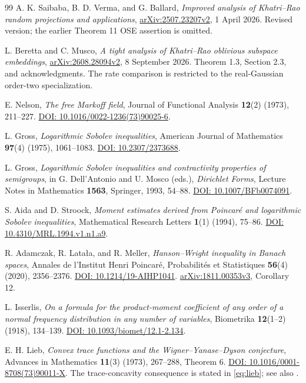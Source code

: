 \documentclass[11pt]{article}
\numberwithin{equation}{section}
\theoremstyle{definition}\newtheorem{definition}[theorem]{Definition}
\theoremstyle{remark}\newtheorem{remark}[theorem]{Remark}
\begin{document}
\begin{thebibliography}{99}
A. K. Saibaba, B. D. Verma, and G. Ballard,
\emph{Improved analysis of Khatri--Rao random projections and applications},
\href{https://arxiv.org/abs/2507.23207v2}{arXiv:2507.23207v2}, 1 April 2026.
Revised version; the earlier Theorem 11 OSE assertion is omitted.

L. Beretta and C. Musco,
\emph{A tight analysis of Khatri--Rao oblivious subspace embeddings},
\href{https://arxiv.org/abs/2608.28094v2}{arXiv:2608.28094v2}, 8 September 2026.
Theorem 1.3, Section 2.3, and acknowledgments.
The rate comparison is restricted to the real-Gaussian order-two specialization.

E. Nelson, \emph{The free Markoff field},
Journal of Functional Analysis \textbf{12}(2) (1973), 211--227.
\href{https://doi.org/10.1016/0022-1236(73)90025-6}{DOI: 10.1016/0022-1236(73)90025-6}.

L. Gross, \emph{Logarithmic Sobolev inequalities},
American Journal of Mathematics \textbf{97}(4) (1975), 1061--1083.
\href{https://doi.org/10.2307/2373688}{DOI: 10.2307/2373688}.

L. Gross, \emph{Logarithmic Sobolev inequalities and contractivity properties of
semigroups}, in G. Dell'Antonio and U. Mosco (eds.), \emph{Dirichlet Forms},
Lecture Notes in Mathematics \textbf{1563}, Springer, 1993, 54--88.
\href{https://doi.org/10.1007/BFb0074091}{DOI: 10.1007/BFb0074091}.

S. Aida and D. Stroock,
\emph{Moment estimates derived from Poincar\'e and logarithmic Sobolev inequalities},
Mathematical Research Letters \textbf{1}(1) (1994), 75--86.
\href{https://doi.org/10.4310/MRL.1994.v1.n1.a9}{DOI: 10.4310/MRL.1994.v1.n1.a9}.

R. Adamczak, R. Lata\l a, and R. Meller,
\emph{Hanson--Wright inequality in Banach spaces},
Annales de l'Institut Henri Poincar\'e, Probabilit\'es et Statistiques
\textbf{56}(4) (2020), 2356--2376.
\href{https://doi.org/10.1214/19-AIHP1041}{DOI: 10.1214/19-AIHP1041}.
\href{https://arxiv.org/abs/1811.00353v3}{arXiv:1811.00353v3}, Corollary 12.

L. Isserlis,
\emph{On a formula for the product-moment coefficient of any order of a normal
frequency distribution in any number of variables},
Biometrika \textbf{12}(1--2) (1918), 134--139.
\href{https://doi.org/10.1093/biomet/12.1-2.134}{DOI: 10.1093/biomet/12.1-2.134}.

E. H. Lieb, \emph{Convex trace functions and the Wigner--Yanase--Dyson conjecture},
Advances in Mathematics \textbf{11}(3) (1973), 267--288, Theorem 6.
\href{https://doi.org/10.1016/0001-8708(73)90011-X}{DOI: 10.1016/0001-8708(73)90011-X}.
The trace-concavity consequence is stated in \eqref{eq:lieb}; see also
\cite[Theorem~3.2]{Tropp}.


\end{thebibliography}
\end{document}
